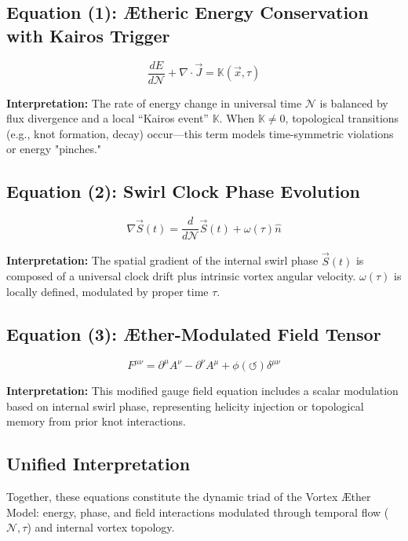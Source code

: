 \subsection*{Equation (1): Ætheric Energy Conservation with Kairos Trigger}
\begin{equation}
    \frac{dE}{d\mathcal{N}} + \nabla \cdot \vec{J} = \mathbb{K}(\vec{x}, \tau)
    \label{eq:Kairos_trigger_energy_conservation}
\end{equation}

\textbf{Interpretation:} The rate of energy change in universal time $\mathcal{N}$ is balanced by flux divergence and a local ``Kairos event'' $\mathbb{K}$. When $\mathbb{K} \neq 0$, topological transitions (e.g., knot formation, decay) occur—this term models time-symmetric violations or energy "pinches."

\subsection*{Equation (2): Swirl Clock Phase Evolution}
\begin{equation}
    \nabla \vec{S}(t) = \frac{d}{d\mathcal{N}} \vec{S}(t) + \omega(\tau) \hat{n}
\label{eq:Swirl_clock_phase_evolution}
\end{equation}

\textbf{Interpretation:} The spatial gradient of the internal swirl phase $\vec{S}(t)$ is composed of a universal clock drift plus intrinsic vortex angular velocity. $\omega(\tau)$ is locally defined, modulated by proper time $\tau$.

\subsection*{Equation (3): Æther-Modulated Field Tensor}
\begin{equation}
    F^{\mu\nu} = \partial^\mu A^\nu - \partial^\nu A^\mu + \phi(\circlearrowleft) \delta^{\mu\nu}
\label{eq:Æther_modulated_field_tensor}
\end{equation}

\textbf{Interpretation:} This modified gauge field equation includes a scalar modulation based on internal swirl phase, representing helicity injection or topological memory from prior knot interactions.

\subsection*{Unified Interpretation}
Together, these equations constitute the dynamic triad of the Vortex Æther Model: energy, phase, and field interactions modulated through temporal flow ($\mathcal{N}, \tau$) and internal vortex topology.

